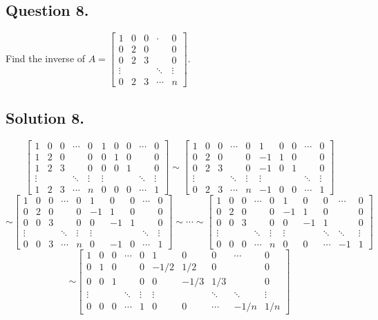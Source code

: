 \documentclass{article}
\begin{document}
\subsection*{Question 8.}
Find the inverse of $A=\left[\begin{array}{ccccc}1&0&0&\cdot&0\\0&2&0&&0\\0&2&3&&0\\\vdots&&&\ddots&\vdots\\0&2&3&\cdots&n\end{array}\right]$.
\subsection*{Solution 8.}
\[\left[\begin{array}{cccccccccc}1&0&0&\cdots&0&1&0&0&\cdots&0\\1&2&0&&0&0&1&0&&0\\1&2&3&&0&0&0&1&&0\\ \vdots&&&\ddots&\vdots&\vdots&&&\ddots&\vdots\\1&2&3&\cdots&n&0&0&0&\cdots&1\end{array}\right]\sim\left[\begin{array}{cccccccccc}1&0&0&\cdots&0&1&0&0&\cdots&0\\0&2&0&&0&-1&1&0&&0\\0&2&3&&0&-1&0&1&&0\\ \vdots&&&\ddots&\vdots&\vdots&&&\ddots&\vdots\\0&2&3&\cdots&n&-1&0&0&\cdots&1\end{array}\right]\]
\[\sim\left[\begin{array}{cccccccccc}1&0&0&\cdots&0&1&0&0&\cdots&0\\0&2&0&&0&-1&1&0&&0\\0&0&3&&0&0&-1&1&&0\\ \vdots&&&\ddots&\vdots&\vdots&&&\ddots&\vdots\\0&0&3&\cdots&n&0&-1&0&\cdots&1\end{array}\right]\sim\cdots\sim\left[\begin{array}{cccccccccc}1&0&0&\cdots&0&1&0&0&\cdots&0\\0&2&0&&0&-1&1&0&&0\\0&0&3&&0&0&-1&1&&0\\ \vdots&&&\ddots&\vdots&\vdots&&\ddots&\ddots&\vdots\\0&0&0&\cdots&n&0&0&\cdots&-1&1\end{array}\right]\]
\[\sim\left[\begin{array}{cccccccccc}1&0&0&\cdots&0&1&0&0&\cdots&0\\0&1&0&&0&-1/2&1/2&0&&0\\0&0&1&&0&0&-1/3&1/3&&0\\ \vdots&&&\ddots&\vdots&\vdots&&\ddots&\ddots&\vdots\\0&0&0&\cdots&1&0&0&\cdots&-1/n&1/n\end{array}\right]\]
\end{document}
